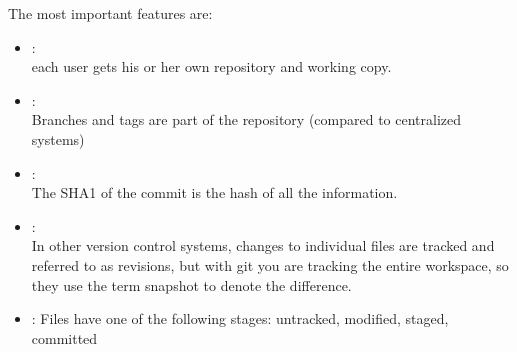 
\newslide
The most important features are:
\begin{itemize}
\item {}:\\
each user gets his or her own repository and working copy.
\item {}:\\
Branches and tags are part of the repository (compared to centralized systems)
\item {}:\\
The SHA1 of the commit is the hash of all the information.
\item {}:\\
In other version control systems, changes to individual files are tracked
and referred to as revisions, but with git you are tracking the entire
workspace, so they use the term snapshot to denote the difference.
\item {}: Files have one of the following stages: untracked,
  modified, staged, committed
\end{itemize}

%

